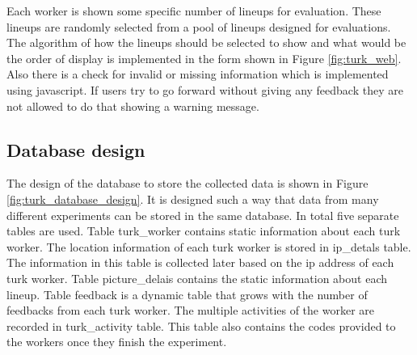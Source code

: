 \documentclass[11pt]{article}
\begin{document}
Each worker is shown some specific number of lineups for evaluation. These lineups are randomly selected from a pool of lineups designed for evaluations. The algorithm of how the lineups should be selected to show and what would be the order of display is implemented in the form shown in Figure \ref{fig:turk_web}. Also there is a check for invalid or missing information which is implemented using javascript. If users try to go forward without giving any feedback they are not allowed to do that showing a warning message.



\subsection{Database design} The design of the database to store the collected data is shown in Figure \ref{fig:turk_database_design}. It is designed such a way that data from many different experiments can be stored in the same database. In total five separate tables are used. Table turk\_worker contains static information about each turk worker. The location information of each turk worker is stored in ip\_detals table. The information in this table is collected later based on the ip address of each turk worker. Table picture\_delais contains the static information about each lineup. Table feedback is a dynamic table that grows with the number of feedbacks from each turk worker. The multiple activities of the worker are recorded in turk\_activity table. This table also contains the codes provided to the workers once they finish the experiment. 
\end{document}
